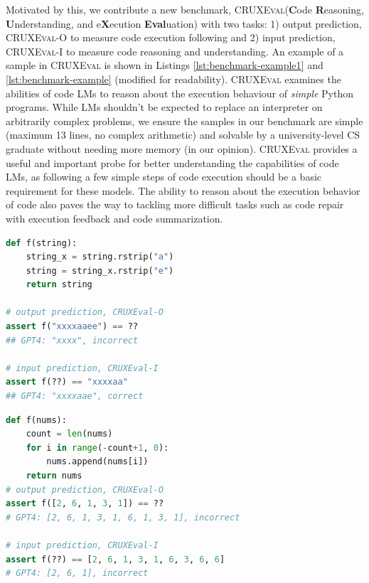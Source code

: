 \documentclass{article}
\newcommand{\benchmark}{\textsc{CRUXEval}\xspace}
\newcommand{\benchmarki}{\textsc{CRUXEval-I}\xspace}
\newcommand{\benchmarko}{\textsc{CRUXEval-O}\xspace}
\begin{document}
Motivated by this, we contribute a new benchmark, \benchmark (\textbf{C}ode \textbf{R}easoning, \textbf{U}nderstanding, and e\textbf{X}ecution \textbf{Eval}uation) with two tasks: 1) output prediction, \benchmarko to measure code execution following and 2) input prediction, \benchmarki to measure code reasoning and understanding. An example of a sample in \benchmark is shown in Listings \ref{lst:benchmark-example1} and \ref{lst:benchmark-example} (modified for readability). \benchmark examines the abilities of code LMs to reason about the execution behaviour of \textit{simple} Python programs. While LMs shouldn't be expected to replace an interpreter on arbitrarily complex problems, we ensure the samples in our benchmark are simple (maximum 13 lines, no complex arithmetic) and solvable by a university-level CS graduate without needing more memory (in our opinion). \benchmark provides a useful and important probe for better understanding the capabilities of code LMs, as following a few simple steps of code execution should be a basic requirement for these models. The ability to reason about the execution behavior of code also paves the way to tackling more difficult tasks such as code repair with execution feedback and code summarization. 


\begin{minipage}{.48\textwidth}
\begin{lstlisting}[caption={Sample problem},label={lst:benchmark-example1}, captionpos=t, breaklines=true, language=Python]
def f(string):
    string_x = string.rstrip("a")
    string = string_x.rstrip("e")
    return string

# output prediction, CRUXEval-O
assert f("xxxxaaee") == ??
## GPT4: "xxxx", incorrect

# input prediction, CRUXEval-I
assert f(??) == "xxxxaa"
## GPT4: "xxxxaae", correct
\end{lstlisting}
\end{minipage}\hfill
\begin{minipage}{.48\textwidth}
\begin{lstlisting}[caption={Sample problem},label={lst:benchmark-example}, captionpos=t, breaklines=true, language=python]
def f(nums):
    count = len(nums)
    for i in range(-count+1, 0):
        nums.append(nums[i])
    return nums
# output prediction, CRUXEval-O
assert f([2, 6, 1, 3, 1]) == ??
# GPT4: [2, 6, 1, 3, 1, 6, 1, 3, 1], incorrect

# input prediction, CRUXEval-I
assert f(??) == [2, 6, 1, 3, 1, 6, 3, 6, 6]
# GPT4: [2, 6, 1], incorrect
\end{lstlisting}
\end{minipage}
\end{document}
